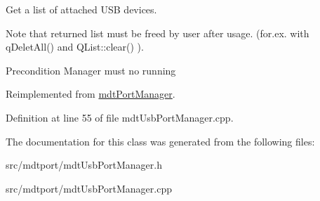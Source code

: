 Get a list of attached USB devices. 

Note that returned list must be freed by user after usage. (for.ex. with qDeletAll() and QList::clear() ).

\begin{DoxyPrecond}{Precondition}
Manager must no running 
\end{DoxyPrecond}


Reimplemented from \hyperlink{classmdt_port_manager_ad56afb411ab5468005fca04767557ece}{mdtPortManager}.



Definition at line 55 of file mdtUsbPortManager.cpp.



The documentation for this class was generated from the following files:\begin{DoxyCompactItemize}
\item 
src/mdtport/mdtUsbPortManager.h\item 
src/mdtport/mdtUsbPortManager.cpp\end{DoxyCompactItemize}
